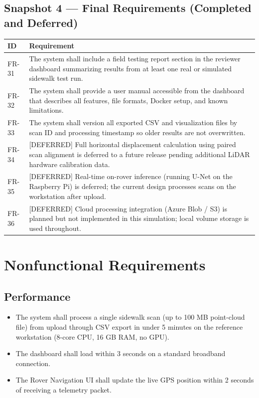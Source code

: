 \documentclass{article}
\begin{document}
\subsection{Snapshot 4 --- Final Requirements (Completed and Deferred)}

\begin{longtable}{|p{0.8in}|p{5.4in}|}
\hline
\textbf{ID} & \textbf{Requirement} \\
\hline
FR-31 & The system shall include a field testing report section in the reviewer dashboard
  summarizing results from at least one real or simulated sidewalk test run. \\
\hline
FR-32 & The system shall provide a user manual accessible from the dashboard that
  describes all features, file formats, Docker setup, and known limitations. \\
\hline
FR-33 & The system shall version all exported CSV and visualization files by scan ID
  and processing timestamp so older results are not overwritten. \\
\hline
FR-34 & [DEFERRED] Full horizontal displacement calculation using paired scan alignment
  is deferred to a future release pending additional LiDAR hardware calibration data. \\
\hline
FR-35 & [DEFERRED] Real-time on-rover inference (running U-Net on the Raspberry Pi)
  is deferred; the current design processes scans on the workstation after upload. \\
\hline
FR-36 & [DEFERRED] Cloud processing integration (Azure Blob / S3) is planned but not
  implemented in this simulation; local volume storage is used throughout. \\
\hline
\end{longtable}

\section{Nonfunctional Requirements}
\label{sec:nonfunctional}

\subsection{Performance}
\begin{itemize}
  \item The system shall process a single sidewalk scan (up to 100 MB point-cloud file)
    from upload through CSV export in under 5 minutes on the reference workstation
    (8-core CPU, 16 GB RAM, no GPU).
  \item The dashboard shall load within 3 seconds on a standard broadband connection.
  \item The Rover Navigation UI shall update the live GPS position within 2 seconds of
    receiving a telemetry packet.
\end{itemize}
\end{document}
